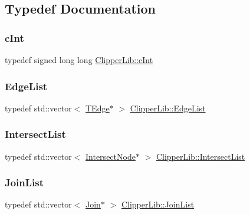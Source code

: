 \subsection{Typedef Documentation}
\mbox{\label{namespace_clipper_lib_a7156730a24951629192d4831334bafaa}} 
\subsubsection{\texorpdfstring{cInt}{cInt}}
{\footnotesize\ttfamily typedef signed long long \mbox{\hyperlink{namespace_clipper_lib_a7156730a24951629192d4831334bafaa}{Clipper\+Lib\+::c\+Int}}}

\mbox{\label{namespace_clipper_lib_a86ece3ad074061d6b3d18819b1fa4ed7}} 
\subsubsection{\texorpdfstring{EdgeList}{EdgeList}}
{\footnotesize\ttfamily typedef std\+::vector$<$ \mbox{\hyperlink{struct_clipper_lib_1_1_t_edge}{T\+Edge}}$\ast$ $>$ \mbox{\hyperlink{namespace_clipper_lib_a86ece3ad074061d6b3d18819b1fa4ed7}{Clipper\+Lib\+::\+Edge\+List}}}

\mbox{\label{namespace_clipper_lib_aa619079161cda3de8197456767f54396}} 
\subsubsection{\texorpdfstring{IntersectList}{IntersectList}}
{\footnotesize\ttfamily typedef std\+::vector$<$ \mbox{\hyperlink{struct_clipper_lib_1_1_intersect_node}{Intersect\+Node}}$\ast$ $>$ \mbox{\hyperlink{namespace_clipper_lib_aa619079161cda3de8197456767f54396}{Clipper\+Lib\+::\+Intersect\+List}}}

\mbox{\label{namespace_clipper_lib_a7e09990d21008cefa4e28e9056c654c4}} 
\subsubsection{\texorpdfstring{JoinList}{JoinList}}
{\footnotesize\ttfamily typedef std\+::vector$<$ \mbox{\hyperlink{struct_clipper_lib_1_1_join}{Join}}$\ast$ $>$ \mbox{\hyperlink{namespace_clipper_lib_a7e09990d21008cefa4e28e9056c654c4}{Clipper\+Lib\+::\+Join\+List}}}

